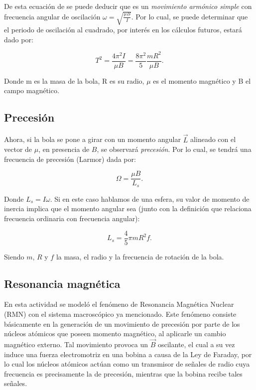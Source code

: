 \documentclass[%
 reprint,
 amsmath,amssymb,
 aps,
]{revtex4-1}
\begin{document}
De esta ecuación de se puede deducir que es un \textit{movimiento armónico simple} con frecuencia angular de oscilación $\omega = \sqrt{\frac{\mu B}{I}}$. Por lo cual, se puede determinar que el periodo de oscilación al cuadrado, por interés en los cálculos futuros, estará dado por:

\begin{equation}
    T^2=\frac{4\pi^2I}{\mu B}=\frac{8\pi^2}{5}\frac{mR^2}{\mu B}.
    \label{eq:armonico}
\end{equation}

Donde m es la masa de la bola, R es su radio, $\mu$ es el momento magnético y B el campo magnético.

\subsection{Precesión}

Ahora, si la bola se pone a girar con un momento angular $\vec{L}$ alineado con el vector de $\mu$, en presencia de $B$, se observará \textit{precesión}. Por lo cual, se tendrá una frecuencia de precesión (Larmor) \cite{prece} dada por:

\begin{equation}
    \Omega = \frac{\mu B}{L_s}.
    \label{eq:larmor}
\end{equation}

Donde $L_s = I \omega$.
Si en este caso hablamos de una esfera, su valor de momento de inercia implica que el momento angular sea (junto con la definición que relaciona frecuencia ordinaria con frecuencia angular):

\begin{equation}
    L_s=\frac{4}{5}\pi mR^2f.
    \label{eq:momangular}
\end{equation}

Siendo $m$, $R$ y $f$ la masa, el radio y la frecuencia de rotación de la bola. 

\subsection{Resonancia magnética}

En esta actividad se modeló el fenómeno de Resonancia Magnética Nuclear (RMN) con el sistema macroscópico ya mencionado. Este fenómeno consiste básicamente en la generación de un movimiento de precesión por parte de los núcleos atómicos que poseen momento magnético, al aplicarle un cambio magnético externo.
Tal movimiento provoca un $\vec{B}$ oscilante, el cual a su vez induce una fuerza electromotriz en una bobina a causa de la Ley de Faraday, por lo cual los núcleos atómicos actúan como un transmisor de señales de radio cuya frecuencia es precisamente la de precesión, mientras que la bobina recibe tales señales. \cite{rmn}
\end{document}
